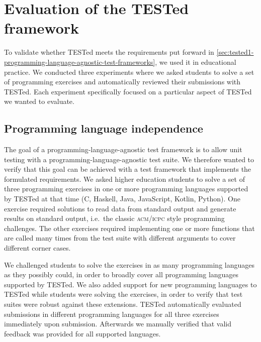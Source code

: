 \documentclass[../main]{subfiles}
\begin{document}
\section{Evaluation of the TESTed framework}\label{sec:tested1-evaluating-tested}

To validate whether TESTed meets the requirements put forward in \vref{sec:tested1-programming-language-agnostic-test-frameworks}, we used it in educational practice.
We conducted three experiments where we asked students to solve a set of programming exercises and automatically reviewed their submissions with TESTed.
Each experiment specifically focused on a particular aspect of TESTed we wanted to evaluate.

\subsection{Programming language independence}\label{subsec:programming-language-independence}

The goal of a programming-language-agnostic test framework is to allow unit testing with a programming-language-agnostic test suite.
We therefore wanted to verify that this goal can be achieved with a test framework that implements the formulated requirements.
We asked higher education students to solve a set of three programming exercises in one or more programming languages supported by TESTed at that time (C, Haskell, Java, JavaScript, Kotlin, Python).
One exercise required solutions to read data from standard output and generate results on standard output, i.e.\ the classic \textsc{acm/icpc} style programming challenges.
The other exercises required implementing one or more functions that are called many times from the test suite with different arguments to cover different corner cases.

We challenged students to solve the exercises in as many programming languages as they possibly could, in order to broadly cover all programming languages supported by TESTed.
We also added support for new programming languages to TESTed while students were solving the exercises, in order to verify that test suites were robust against these extensions.
TESTed automatically evaluated submissions in different programming languages for all three exercises immediately upon submission.
Afterwards we manually verified that valid feedback was provided for all supported languages.
\end{document}
